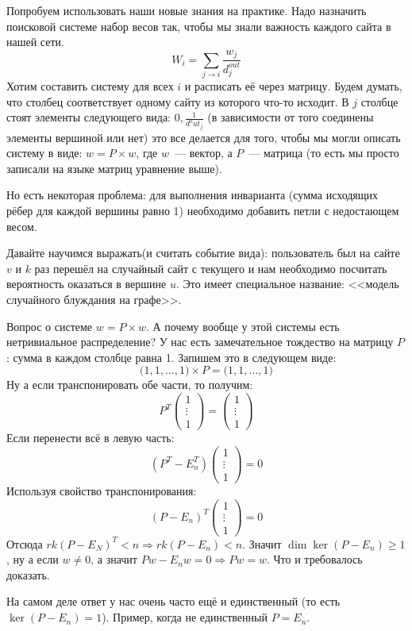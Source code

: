 \begin{example}
    Попробуем использовать наши новые знания на практике.
    Надо назначить поисковой системе набор весов так, чтобы
    мы знали важность каждого сайта в нашей сети.
    $$W_i = \sum_{j\rightarrow i} \frac{w_j}{d_j^{out}}$$
    Хотим составить систему для всех $i$ и расписать
    её через матрицу. Будем думать, что столбец соответствует
    одному сайту из которого что-то исходит. В $j$ столбце
    стоят элементы следующего вида: $0, \frac{1}{d^out_j}$
    (в зависимости от того соединены элементы вершиной или нет)
    это все делается для того, чтобы мы могли описать систему
    в виде: $w = P\times w$, где $w$~--- вектор, а $P$~--- матрица
    (то есть мы просто записали на языке матриц уравнение выше).

    Но есть некоторая проблема: для выполнения инварианта
    (сумма исходящих рёбер для каждой вершины равно 1) необходимо
    добавить петли с недостающем весом.

    Давайте научимся выражать(и считать событие вида): 
    пользователь был на сайте $v$ и $k$ раз перешёл на случайный
    сайт с текущего и нам необходимо посчитать вероятность
    оказаться в вершине $u$. Это имеет специальное название:
    <<модель случайного блуждания на графе>>. 

    Вопрос о системе $w = P\times w$. А почему вообще у этой
    системы есть нетривиальное распределение? У нас есть
    замечательное тождество на матрицу $P$: сумма в каждом
    столбце равна 1. Запишем это в следующем виде:
    $$\big(1,1,\dots, 1\big)\times P = \big(1,1,\dots, 1\big)$$
    Ну а если транспонировать обе части, то получим:
    $$
    P^T\begin{pmatrix}
        1\\\vdots\\1
    \end{pmatrix} = 
    \begin{pmatrix}
        1\\\vdots\\1
    \end{pmatrix}
    $$
    Если перенести всё в левую часть:
    $$
    (P^T - E_n^T)\begin{pmatrix}
        1\\\vdots\\1
    \end{pmatrix} = 0
    $$
    Используя свойство транспонирования:
    $$
    (P - E_n)^T\begin{pmatrix}
        1\\\vdots\\1
    \end{pmatrix} = 0
    $$
    Отсюда $rk(P - E_N)^T<n \Rightarrow rk(P - E_n)<n$.
    Значит $\dim \ker(P - E_n) \ge 1$, ну а если $w\not=0$,
    а значит $Pw -  E_nw = 0\Rightarrow Pw = w$.
    Что и требовалось доказать.

    На самом деле ответ у нас очень часто ещё и единственный
    (то есть $\ker(P-E_n)=1$). Пример, когда не единственный $P = E_n$.
\end{example}
